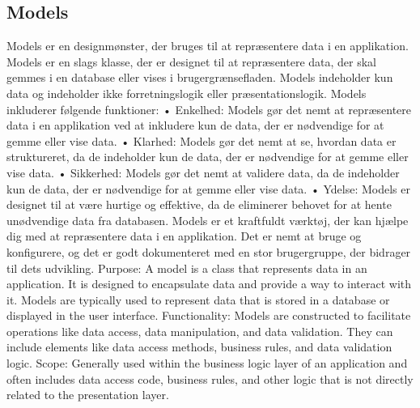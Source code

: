 \subsection{Models}
Models er en designmønster, der bruges til at repræsentere data i en applikation. Models er en slags klasse, der er designet til at repræsentere data, der skal gemmes i en database eller vises i brugergrænsefladen. Models indeholder kun data og indeholder ikke forretningslogik eller præsentationslogik.
Models inkluderer følgende funktioner:
•	Enkelhed: Models gør det nemt at repræsentere data i en applikation ved at inkludere kun de data, der er nødvendige for at gemme eller vise data.
•	Klarhed: Models gør det nemt at se, hvordan data er struktureret, da de indeholder kun de data, der er nødvendige for at gemme eller vise data.
•	Sikkerhed: Models gør det nemt at validere data, da de indeholder kun de data, der er nødvendige for at gemme eller vise data.
•	Ydelse: Models er designet til at være hurtige og effektive, da de eliminerer behovet for at hente unødvendige data fra databasen.
Models er et kraftfuldt værktøj, der kan hjælpe dig med at repræsentere data i en applikation. Det er nemt at bruge og konfigurere, og det er godt dokumenteret med en stor brugergruppe, der bidrager til dets udvikling.
Purpose: A model is a class that represents data in an application. It is designed to encapsulate data and provide a way to interact with it. Models are typically used to represent data that is stored in a database or displayed in the user interface.
Functionality: Models are constructed to facilitate operations like data access, data manipulation, and data validation. They can include elements like data access methods, business rules, and data validation logic.
Scope: Generally used within the business logic layer of an application and often includes data access code, business rules, and other logic that is not directly related to the presentation layer.

